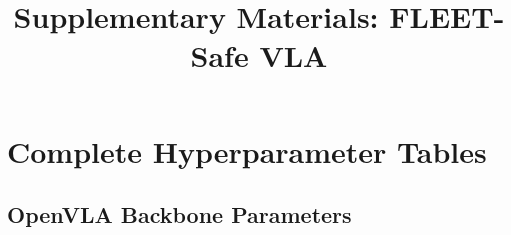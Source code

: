 \documentclass[conference]{IEEEtran}
\begin{document}
\title{Supplementary Materials: FLEET-Safe VLA}
\author{
}
\maketitle

\section{Complete Hyperparameter Tables}
\label{sec:supp_hyper}

\subsection{OpenVLA Backbone Parameters}
\end{document}
